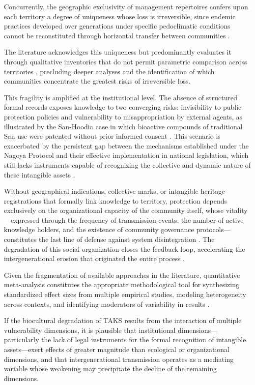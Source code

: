 \documentclass[12pt,a4paper]{article}
\begin{document}
Concurrently, the geographic exclusivity of management repertoires confers upon each territory a degree of uniqueness whose loss is irreversible, since endemic practices developed over generations under specific pedoclimatic conditions cannot be reconstituted through horizontal transfer between communities \citep{Laborde2023,Ens2016}.

The literature acknowledges this uniqueness but predominantly evaluates it through qualitative inventories that do not permit parametric comparison across territories \citep{CalvetMir2016,LaRosa2021,Saiba2023}, precluding deeper analyses and the identification of which communities concentrate the greatest risks of irreversible loss.

This fragility is amplified at the institutional level. The absence of structured formal records exposes knowledge to two converging risks: invisibility to public protection policies \citep{Santilli2009} and vulnerability to misappropriation by external agents, as illustrated by the San-Hoodia case in which bioactive compounds of traditional San use were patented without prior informed consent \citep{Wynberg2015}. This scenario is exacerbated by the persistent gap between the mechanisms established under the Nagoya Protocol and their effective implementation in national legislation, which still lacks instruments capable of recognizing the collective and dynamic nature of these intangible assets \citep{Laird2020}.

Without geographical indications, collective marks, or intangible heritage registrations that formally link knowledge to territory, protection depends exclusively on the organizational capacity of the community itself, whose vitality---expressed through the frequency of transmission events, the number of active knowledge holders, and the existence of community governance protocols---constitutes the last line of defense against system disintegration \citep{FalsBorda1991,Ostrom1990}. The degradation of this social organization closes the feedback loop, accelerating the intergenerational erosion that originated the entire process \citep{Agrawal2002}.

Given the fragmentation of available approaches in the literature, quantitative meta-analysis constitutes the appropriate methodological tool for synthesizing standardized effect sizes from multiple empirical studies, modeling heterogeneity across contexts, and identifying moderators of variability in results \citep{Borenstein2009}.

If the biocultural degradation of TAKS results from the interaction of multiple vulnerability dimensions, it is plausible that institutional dimensions---particularly the lack of legal instruments for the formal recognition of intangible assets---exert effects of greater magnitude than ecological or organizational dimensions, and that intergenerational transmission operates as a mediating variable whose weakening may precipitate the decline of the remaining dimensions.
\end{document}
